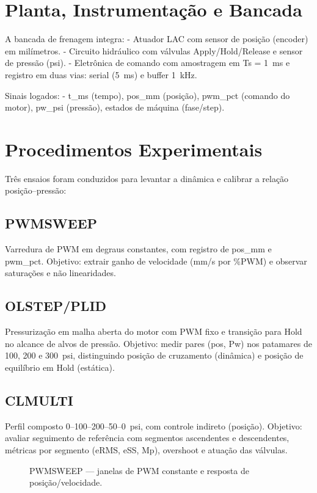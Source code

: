 \section{Planta, Instrumentação e Bancada}
A bancada de frenagem integra:
- Atuador LAC com sensor de posição (encoder) em milímetros.
- Circuito hidráulico com válvulas Apply/Hold/Release e sensor de pressão (psi).
- Eletrônica de comando com amostragem em Ts = 1~ms e registro em duas vias: serial (5~ms) e buffer 1~kHz.

Sinais logados:
- t\_ms (tempo), pos\_mm (posição), pwm\_pct (comando do motor), pw\_psi (pressão), estados de máquina (fase/step).

\section{Procedimentos Experimentais}
Três ensaios foram conduzidos para levantar a dinâmica e calibrar a relação posição–pressão:
\subsection{PWMSWEEP}
Varredura de PWM em degraus constantes, com registro de pos\_mm e pwm\_pct. Objetivo: extrair ganho de velocidade (mm/s por \%PWM) e observar saturações e não linearidades.

\subsection{OLSTEP/PLID}
Pressurização em malha aberta do motor com PWM fixo e transição para Hold no alcance de alvos de pressão. Objetivo: medir pares (pos, Pw) nos patamares de 100, 200 e 300~psi, distinguindo posição de cruzamento (dinâmica) e posição de equilíbrio em Hold (estática).

\subsection{CLMULTI}
Perfil composto 0–100–200–50–0~psi, com controle indireto (posição). Objetivo: avaliar seguimento de referência com segmentos ascendentes e descendentes, métricas por segmento (eRMS, eSS, Mp), overshoot e atuação das válvulas.

\begin{figure}[h]
  \centering
  \caption{PWMSWEEP — janelas de PWM constante e resposta de posição/velocidade.}
  \label{fig:pwmsweep}
\end{figure}


